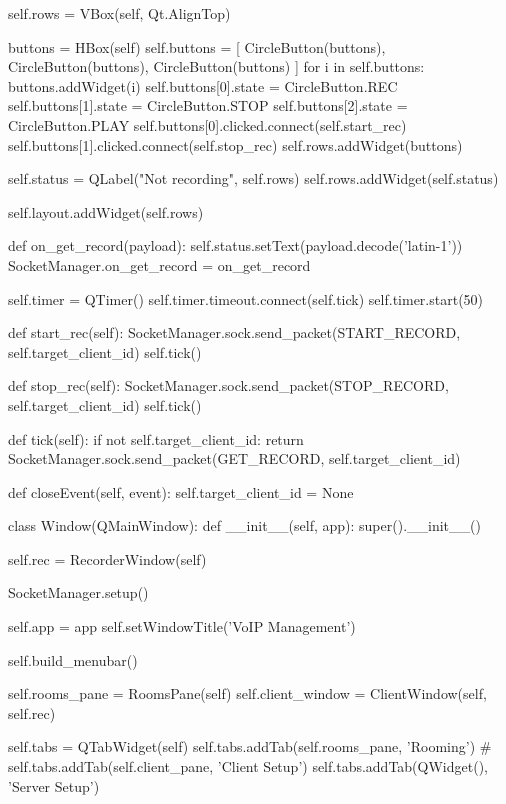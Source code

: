 \begin{pythoncode}
        self.rows = VBox(self, Qt.AlignTop)

        buttons = HBox(self)
        self.buttons = [
            CircleButton(buttons),
            CircleButton(buttons),
            CircleButton(buttons)
        ]
        for i in self.buttons:
            buttons.addWidget(i)
        self.buttons[0].state = CircleButton.REC
        self.buttons[1].state = CircleButton.STOP
        self.buttons[2].state = CircleButton.PLAY
        self.buttons[0].clicked.connect(self.start_rec)
        self.buttons[1].clicked.connect(self.stop_rec)
        self.rows.addWidget(buttons)

        self.status = QLabel("Not recording", self.rows)
        self.rows.addWidget(self.status)

        self.layout.addWidget(self.rows)

        def on_get_record(payload):
            self.status.setText(payload.decode('latin-1'))
        SocketManager.on_get_record = on_get_record

        self.timer = QTimer()
        self.timer.timeout.connect(self.tick)
        self.timer.start(50)

    def start_rec(self):
        SocketManager.sock.send_packet(START_RECORD, self.target_client_id)
        self.tick()

    def stop_rec(self):
        SocketManager.sock.send_packet(STOP_RECORD, self.target_client_id)
        self.tick()

    def tick(self):
        if not self.target_client_id:
            return
        SocketManager.sock.send_packet(GET_RECORD, self.target_client_id)

    def closeEvent(self, event):
        self.target_client_id = None


class Window(QMainWindow):
    def __init__(self, app):
        super().__init__()

        self.rec = RecorderWindow(self)

        SocketManager.setup()

        self.app = app
        self.setWindowTitle('VoIP Management')

        self.build_menubar()

        self.rooms_pane = RoomsPane(self)
        self.client_window = ClientWindow(self, self.rec)

        self.tabs = QTabWidget(self)
        self.tabs.addTab(self.rooms_pane, 'Rooming')
        # self.tabs.addTab(self.client\_pane, 'Client Setup')
        self.tabs.addTab(QWidget(), 'Server Setup')


\end{pythoncode}
